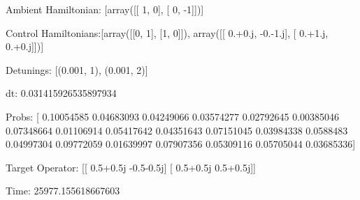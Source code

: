 \documentclass{article}
\begin{document}
    

\newpage

Ambient Hamiltonian: [array([[ 1,  0],
       [ 0, -1]])]

Control Hamiltonians:[array([[0, 1],
       [1, 0]]), array([[ 0.+0.j, -0.-1.j],
       [ 0.+1.j,  0.+0.j]])]

Detunings: [(0.001, 1), (0.001, 2)]

 dt: 0.031415926535897934

Probs: [ 0.10054585  0.04683093  0.04249066  0.03574277  0.02792645  0.00385046
  0.07348664  0.01106914  0.05417642  0.04351643  0.07151045  0.03984338
  0.0588483   0.04997304  0.09772059  0.01639997  0.07907356  0.05309116
  0.05705044  0.03685336]

Target Operator: [[ 0.5+0.5j -0.5-0.5j]
 [ 0.5+0.5j  0.5+0.5j]]

Time: 25977.155618667603
\end{document}
